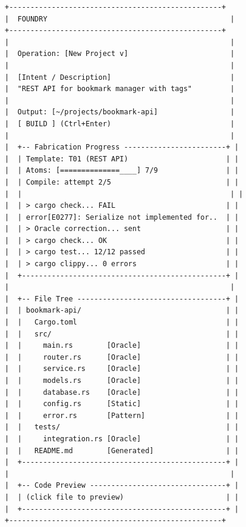 \documentclass[11pt,a4paper,twoside]{article}
\begin{document}
\begin{lstlisting}[title={Foundry Layout}]
+--------------------------------------------------+
|  FOUNDRY                                           |
+--------------------------------------------------+
|                                                    |
|  Operation: [New Project v]                        |
|                                                    |
|  [Intent / Description]                            |
|  "REST API for bookmark manager with tags"         |
|                                                    |
|  Output: [~/projects/bookmark-api]                 |
|  [ BUILD ] (Ctrl+Enter)                            |
|                                                    |
|  +-- Fabrication Progress ------------------------+ |
|  | Template: T01 (REST API)                       | |
|  | Atoms: [==============____] 7/9                | |
|  | Compile: attempt 2/5                           | |
|  |                                                 | |
|  | > cargo check... FAIL                          | |
|  | error[E0277]: Serialize not implemented for..  | |
|  | > Oracle correction... sent                    | |
|  | > cargo check... OK                            | |
|  | > cargo test... 12/12 passed                   | |
|  | > cargo clippy... 0 errors                     | |
|  +------------------------------------------------+ |
|                                                    |
|  +-- File Tree -----------------------------------+ |
|  | bookmark-api/                                  | |
|  |   Cargo.toml                                   | |
|  |   src/                                         | |
|  |     main.rs        [Oracle]                    | |
|  |     router.rs      [Oracle]                    | |
|  |     service.rs     [Oracle]                    | |
|  |     models.rs      [Oracle]                    | |
|  |     database.rs    [Oracle]                    | |
|  |     config.rs      [Static]                    | |
|  |     error.rs       [Pattern]                   | |
|  |   tests/                                       | |
|  |     integration.rs [Oracle]                    | |
|  |   README.md        [Generated]                 | |
|  +------------------------------------------------+ |
|                                                    |
|  +-- Code Preview --------------------------------+ |
|  | (click file to preview)                        | |
|  +------------------------------------------------+ |
+--------------------------------------------------+
\end{lstlisting}
\end{document}
